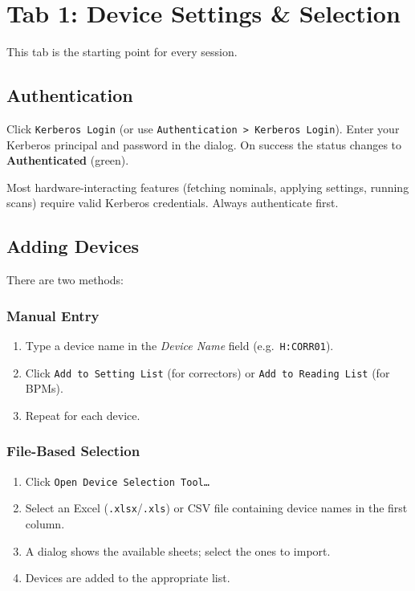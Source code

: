 \documentclass[11pt,a4paper,twoside]{report}
\newcommand{\menupath}[1]{\texttt{\small #1}}
\newcommand{\btn}[1]{\colorbox{accent!12}{\texttt{\small #1}}}
\newcommand{\field}[1]{\textit{#1}}
\begin{document}
\section{Tab 1: Device Settings \& Selection}\label{sec:tab1}

This tab is the starting point for every session.

\subsection{Authentication}

\begin{stepbox}
Click \btn{Kerberos Login} (or use \menupath{Authentication > Kerberos Login}).
Enter your Kerberos principal and password in the dialog. On success the status changes to \textcolor{accent2}{\textbf{Authenticated}} (green).
\end{stepbox}

\begin{warnbox}
Most hardware-interacting features (fetching nominals, applying settings, running scans) require valid Kerberos credentials. Always authenticate first.
\end{warnbox}

\subsection{Adding Devices}

There are two methods:

\subsubsection{Manual Entry}
\begin{enumerate}
  \item Type a device name in the \field{Device Name} field (e.g.\ \texttt{H:CORR01}).
  \item Click \btn{Add to Setting List} (for correctors) or \btn{Add to Reading List} (for BPMs).
  \item Repeat for each device.
\end{enumerate}

\subsubsection{File-Based Selection}
\begin{enumerate}
  \item Click \btn{Open Device Selection Tool\ldots}
  \item Select an Excel (\texttt{.xlsx}/\texttt{.xls}) or CSV file containing device names in the first column.
  \item A dialog shows the available sheets; select the ones to import.
  \item Devices are added to the appropriate list.
\end{enumerate}
\end{document}
